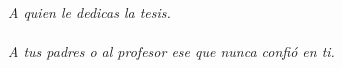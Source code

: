 \chapter*{} %


\begin{flushright}
    \textit{A quien le dedicas la tesis. \\~\\ A tus padres o al profesor ese que nunca confió en ti. }
\end{flushright}

